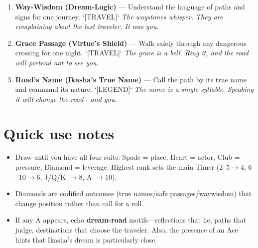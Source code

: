 \begin{enumerate}
  \hfill \textit{The paths are labeled: Regret, Forgive, Forget. Choose carefully.}
\item[Q] \textbf{Way-Wisdom (Dream-Logic)} --- Understand the language of paths and signs for one journey. `[TRAVEL]`
  \hfill \textit{The waystones whisper. They are complaining about the last traveler. It was you.}
\item[K] \textbf{Grace Passage (Virtue's Shield)} --- Walk safely through any dangerous crossing for one night. `[TRAVEL]`
  \hfill \textit{The grace is a bell. Ring it, and the road will pretend not to see you.}
\item[A] \textbf{Road's Name (Ikasha's True Name)} --- Call the path by its true name and command its nature. `[LEGEND]`
  \hfill \textit{The name is a single syllable. Speaking it will change the road---and you.}
\end{enumerate}

\section*{Quick use notes}
\label{sec:ways-between-quick-use}
\begin{itemize}
\item Draw until you have all four suits: Spade = place, Heart = actor, Club = pressure, Diamond = leverage. Highest rank sets the main Timer ($2$--$5 \rightarrow 4$, $6$--$10 \rightarrow 6$, J/Q/K $\rightarrow 8$, A $\rightarrow 10$).
\item Diamonds are codified outcomes (true names/safe passages/waywisdom) that change position rather than call for a roll.
\item If any A appears, echo \textbf{dream-road} motifs---reflections that lie, paths that judge, destinations that choose the traveler. Also, the presence of an Ace hints that Ikasha's dream is particularly close.
\end{itemize}

